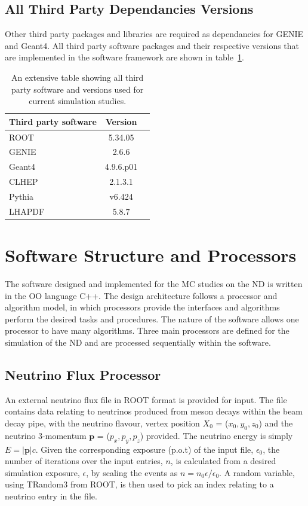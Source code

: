 \subsection{All Third Party Dependancies Versions}
Other third party packages and libraries are required as dependancies for GENIE and Geant4. All third party software packages and their respective versions that are implemented in the software framework are shown in table~\ref{tab:softwareVersion}.
\begin{table}[h]
\centering
	\begin{tabular}{lcc}
	\hline
	\textbf{Third party software} & \textbf{Version} \\
	\hline
	ROOT \cite{ROOT} & 5.34.05 \\ 
	GENIE \cite{GENIE} & 2.6.6 \\
	Geant4 \cite{GEANT} & 4.9.6.p01 \\
	CLHEP & 2.1.3.1 \\
	Pythia & v6.424 \\
	LHAPDF & 5.8.7 \\
	\hline
\end{tabular}
\caption{An extensive table showing all third party software and versions used for current simulation studies.}
\label{tab:softwareVersion}
\end{table}

\section{Software Structure and Processors}
The software designed and implemented for the MC studies on the ND is written in the OO language C++. The design architecture follows a processor and algorithm model, in which processors provide the interfaces and algorithms perform the desired tasks and procedures. The nature of the software allows one processor to have many algorithms. Three main processors are defined for the simulation of the ND and are processed sequentially within the software.

\subsection{Neutrino Flux Processor}
An external neutrino flux file in ROOT format is provided for input. The file contains data relating to neutrinos produced from meson decays within the beam decay pipe, with the neutrino flavour, vertex position \textbf{$X_{0}$} = ($x_{0},y_{0},z_{0}$) and the neutrino 3-momentum $\textbf{p}$ = ($p_{x},p_{y},p_{z}$) provided. The neutrino energy is simply $E = |\textbf{p}|c$. Given the corresponding exposure (p.o.t) of the input file, $\epsilon_{0}$, the number of iterations over the input entries, $n$, is calculated from a desired simulation exposure, $\epsilon$, by scaling the events as $n = n_{0}\epsilon/\epsilon_{0}$. A random variable, using TRandom3 from ROOT, is then used to pick an index relating to a neutrino entry in the file. 
	
